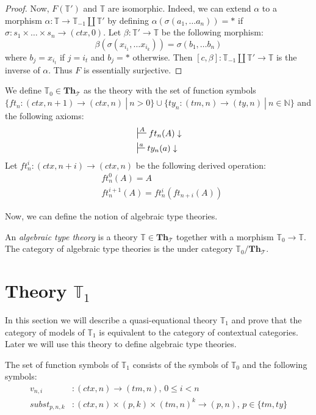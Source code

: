 \documentclass[reqno]{amsart}
\theoremstyle{definition}
\theoremstyle{remark}
\newcommand{\cat}[1]{\mathbf{#1}}
\newcommand{\Th}{\cat{Th}}
\newcommand{\ThT}{\Th_{\mathcal{T}}}
\numberwithin{figure}{section}
\begin{document}
\begin{proof}
Now, $F(\mathbb{T}')$ and $\mathbb{T}$ are isomorphic.
Indeed, we can extend $\alpha$ to a morphism $\alpha : \mathbb{T} \to \mathbb{T}_{-1} \amalg \mathbb{T}'$
by defining $\alpha(\sigma(a_1, \ldots a_n)) = *$ if $\sigma : s_1 \times \ldots \times s_n \to (ctx,0)$.
Let $\beta : \mathbb{T}' \to \mathbb{T}$ be the following morphism:
\[ \beta(\sigma(x_{i_1}, \ldots x_{i_k})) = \sigma(b_1, \ldots b_n) \]
where $b_j = x_{i_t}$ if $j = i_t$ and $b_j = *$ otherwise.
Then $[c,\beta] : \mathbb{T}_{-1} \amalg \mathbb{T}' \to \mathbb{T}$ is the inverse of $\alpha$.
Thus $F$ is essentially surjective.
\end{proof}

We define $\mathbb{T}_0 \in \ThT$ as the theory with the set of function symbols $\{ ft_n : (ctx,n+1) \to (ctx,n)\ |\ n > 0 \} \cup \{ ty_n : (tm,n) \to (ty,n)\ |\ n \in \mathbb{N} \}$ and the following axioms:
\begin{align*}
& \sststile{}{A} ft_n(A) \downarrow \\
& \sststile{}{a} ty_n(a) \downarrow
\end{align*}
Let $ft^i_n : (ctx,n+i) \to (ctx,n)$ be the following derived operation:
\begin{align*}
& ft^0_n(A) = A \\
& ft^{i+1}_n(A) = ft^i_n(ft_{n+i}(A))
\end{align*}

Now, we can define the notion of algebraic type theories.

\begin{defn}
An \emph{algebraic type theory} is a theory $\mathbb{T} \in \ThT$ together with a morphism $\mathbb{T}_0 \to \mathbb{T}$.
The category of algebraic type theories is the under category $\mathbb{T}_0/\ThT$.
\end{defn}

\label{sec:T1}
\section{Theory $\mathbb{T}_1$}


In this section we will describe a quasi-equational theory $\mathbb{T}_1$ and prove that the category of models of $\mathbb{T}_1$ is equivalent to the category of contextual categories.
Later we will use this theory to define algebraic type theories.

The set of function symbols of $\mathbb{T}_1$ consists of the symbols of $\mathbb{T}_0$ and the following symbols:
\begin{align*}
v_{n,i}       & : (ctx,n) \to (tm,n) \text{, } 0 \leq i < n \\
subst_{p,n,k} & : (ctx,n) \times (p,k) \times (tm,n)^k \to (p,n) \text{, } p \in \{ tm, ty \}
\end{align*}
\end{document}
